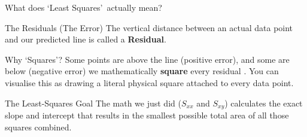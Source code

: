 \begin{frame}{What does \lq Least Squares\rq\ actually mean?}
    \begin{block}{The Residuals (The Error)}
        The vertical distance between an actual data point and our predicted line is called a \textbf{Residual}.
    \end{block}

    \begin{block}{Why \lq Squares\rq ?}
        Some points are above the line (positive error), and some are below (negative error)  we mathematically \textbf{square} every residual . You can visualise this as drawing a literal physical square attached to every data point.
    \end{block}

    \begin{alertblock}{The Least-Squares Goal}
        The math we just did ($S_{xx}$ and $S_{xy}$) calculates the exact slope and intercept that results in the smallest possible total area of all those squares combined.
    \end{alertblock}
\end{frame}

